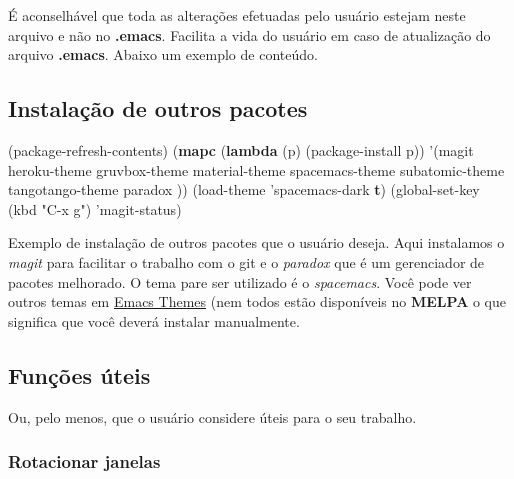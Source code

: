 \documentclass[]{article}
\newenvironment{Shaded}{}{}
\newcommand{\KeywordTok}[1]{\textcolor[rgb]{0.00,0.44,0.13}{\textbf{{#1}}}}
\newcommand{\StringTok}[1]{\textcolor[rgb]{0.25,0.44,0.63}{{#1}}}
\newcommand{\NormalTok}[1]{{#1}}
\begin{document}
É aconselhável que toda as alterações efetuadas pelo usuário estejam
neste arquivo e não no \textbf{.emacs}. Facilita a vida do usuário em
caso de atualização do arquivo \textbf{.emacs}. Abaixo um exemplo de
conteúdo.

\subsection{Instalação de outros
pacotes}\label{instalauxe7uxe3o-de-outros-pacotes}

\begin{Shaded}
\begin{Highlighting}[]
\NormalTok{(package-refresh-contents)}
\NormalTok{(}\KeywordTok{mapc} \NormalTok{(}\KeywordTok{lambda} \NormalTok{(p)}
    \NormalTok{(package-install p))}
      \NormalTok{'(magit}
        \NormalTok{heroku-theme}
    \NormalTok{gruvbox-theme}
        \NormalTok{material-theme }
    \NormalTok{spacemacs-theme}
    \NormalTok{subatomic-theme}
    \NormalTok{tangotango-theme}
    \NormalTok{paradox}
    \NormalTok{))}
\NormalTok{(load-theme 'spacemacs-dark }\KeywordTok{t}\NormalTok{)}
\NormalTok{(global-set-key (kbd }\StringTok{"C-x g"}\NormalTok{) 'magit-status)}
\end{Highlighting}
\end{Shaded}

Exemplo de instalação de outros pacotes que o usuário deseja. Aqui
instalamos o \emph{magit} para facilitar o trabalho com o git e o
\emph{paradox} que é um gerenciador de pacotes melhorado. O tema pare
ser utilizado é o \emph{spacemacs}. Você pode ver outros temas em
\href{https://emacsthemes.com/index/1.html}{Emacs Themes} (nem todos
estão disponíveis no \textbf{MELPA} o que significa que você deverá
instalar manualmente.

\subsection{Funções úteis}\label{funuxe7uxf5es-uxfateis}

Ou, pelo menos, que o usuário considere úteis para o seu trabalho.

\subsubsection{Rotacionar janelas}\label{rotacionar-janelas}
\end{document}
